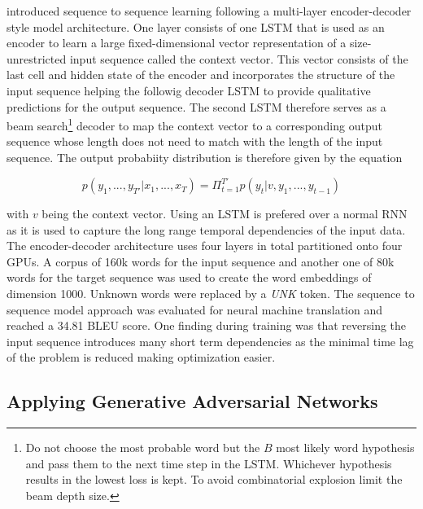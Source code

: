 \cite{Sutskever2014} introduced sequence to sequence learning following a multi-layer encoder-decoder style model architecture. One layer consists of one \ac{LSTM} that is used as an encoder to learn a large fixed-dimensional vector representation of a size-unrestricted input sequence called the context vector. This vector consists of the last cell and hidden state of the encoder and incorporates the structure of the input sequence helping the followig decoder \ac{LSTM} to provide qualitative predictions for the output sequence. The second \ac{LSTM} therefore serves as a beam search\footnote{Do not choose the most probable word but the $B$ most likely word hypothesis and pass them to the next time step in the \ac{LSTM}. Whichever hypothesis results in the lowest loss is kept. To avoid combinatorial explosion limit the beam depth size.} decoder to map the context vector to a corresponding output sequence whose length does not need to match with the length of the input sequence. The output probabiity distribution is therefore given by the equation

\begin{equation}
	p(y_1, ..., y_{T'} | x_1, ..., x_{T}) = \Pi_{t=1}^{T'} p(y_t | v, y_1, ..., y_{t-1})
\end{equation}

with $v$ being the context vector. Using an \ac{LSTM} is prefered over a normal \ac{RNN} as it is used to capture the long range temporal dependencies of the input data. The encoder-decoder architecture uses four layers in total partitioned onto four \acp{GPU}. A corpus of 160k words for the input sequence and another one of 80k words for the target sequence was used to create the word embeddings of dimension 1000. Unknown words were replaced by a \textit{UNK} token. The sequence to sequence model approach was evaluated for neural machine translation and reached a 34.81 BLEU score. One finding during training was that reversing the input sequence introduces many short term dependencies as the minimal time lag of the problem is reduced making optimization easier. \cite{Sutskever2014}

\subsection{Applying Generative Adversarial Networks} \label{fundamentalsF}

